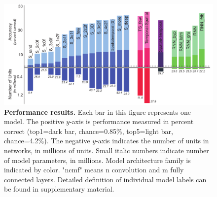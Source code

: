 \begin{figure}
\FigCenter
\includegraphics [width=\DefaultFigSize\linewidth]{figures/results.pdf}
\vspace{-3mm}
\caption{\footnotesize{\textbf{Performance results.} Each bar in this figure represents one model. The positive $y$-axis is performance measured in percent correct (top1=dark bar, chance=0.85\%, top5=light bar, chance=4.2\%).  The negative $y$-axis indicates the number of units in networks, in millions of units.  Small italic numbers indicate number of model parameters, in millions. Model architecture family is indicated by color. "ncmf" means n convolution and m fully connected layers. Detailed definition of individual model labels can be found in supplementary material.}~\label{fig_main}}
\vspace{-5mm}
\end{figure}

